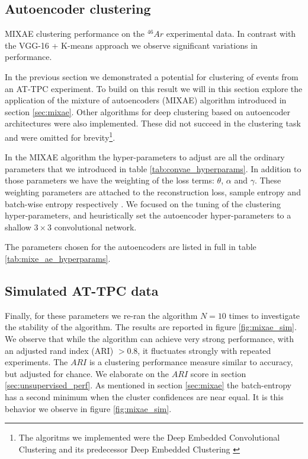 \documentclass[review,number,sort&compress]{elsarticle}
\begin{document}
\subsection{Autoencoder clustering}


\begin{table}[H]
\centering 
\caption[MIXAE clustering performance]{MIXAE clustering performance on the ${}^{46} Ar$ experimental data. In contrast with the VGG-16 + K-means approach we observe  significant variations in performance.}\label{tab:clstr_vgg}

\end{table}


In the previous section we demonstrated a potential for clustering of events from an AT-TPC experiment. To build on this result we will in this section explore the application of the mixture of autoencoders (MIXAE) algorithm introduced in section \ref{sec:mixae}.
Other algorithms for deep clustering based on autoencoder architectures were also implemented. These did not succeed in the clustering task and were omitted for brevity\footnote{The algoritms we implemented were the Deep Embedded Convolutional Clustering \cite{Guo2017} and its predecessor Deep Embedded Clustering \cite{Xie2016}}.

In the MIXAE algorithm the hyper-parameters to adjust are all the ordinary parameters that we introduced in table \ref{tab:convae_hyperparams}. In addition to those parameters we have the weighting of the loss terms: $\theta$, $\alpha$ and $\gamma$. These weighting parameters are attached to the reconstruction loss, sample entropy and batch-wise entropy respectively \cite{Zhang}. 
We focused on the tuning of the clustering hyper-parameters, and heuristically set the autoencoder hyper-parameters to a shallow $3\times3$ convolutional network.  

The parameters chosen for the autoencoders are listed in full in table \ref{tab:mixe_ae_hyperparams}.


\subsection{Simulated AT-TPC data}


Finally, for these parameters we re-ran the algorithm $N=10$ times to investigate the stability of the algorithm. The results are reported in figure \ref{fig:mixae_sim}. We observe that while the algorithm can achieve very strong performance, with an adjusted rand index (ARI) $ > 0.8$, it fluctuates strongly with repeated experiments. The $ARI$ is a clustering performance measure similar to accuracy, but adjusted for chance. We elaborate on the $ARI$ score in section \ref{sec:unsupervised_perf}. As mentioned in section \ref{sec:mixae} the batch-entropy has a second minimum when the cluster confidences are near equal. It is this behavior we observe in figure \ref{fig:mixae_sim}.
\end{document}
